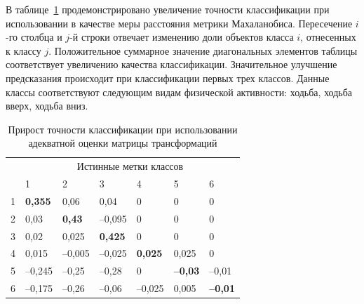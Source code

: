 	В таблице~\ref{ch5:tbl:improvement} продемонстрировано увеличение точности классификации при использовании в качестве меры расстояния метрики Махаланобиса.
	Пересечение $i$-го столбца и $j$-й строки отвечает изменению доли объектов класса $i$, отнесенных к классу $j$. Положительное суммарное значение диагональных элементов таблицы соответствует увеличению качества классификации. Значительное улучшение предсказания происходит при классификации первых трех классов.
	Данные классы соответствуют следующим видам физической активности: ходьба, ходьба вверх, ходьба вниз.
	
	\begin{table}
		\centering
		\caption{Прирост точности классификации при использовании адекватной оценки матрицы трансформаций}
		\label{ch5:tbl:improvement}
		\begin{tabular}{|l|l|l|l|l|l|l|}
			\hline
			\multirow{2}{*}{} & \multicolumn{6}{c|}{Истинные метки классов}       \\ \cline{2-7}
			& 1      & 2      & 3      & 4      & 5     & 6     \\ \hline
			1   & \textbf{0,355}  & 0,06   & 0,04   & 0      & 0     & 0     \\ \hline
			2   & 0,03   & \textbf{0,43}   & --0,095 & 0      & 0     & 0     \\ \hline
			3   & 0,02   & 0,025  & \textbf{0,425}  & 0      & 0     & 0     \\ \hline
			4   & 0,015  & --0,005 & --0,025 & \textbf{0,025}  & 0,025 & 0     \\ \hline
			5   & --0,245 & --0,25  & --0,28  & 0      & \textbf{--0,03} & --0,01 \\ \hline
			6   & --0,175 & --0,26  & --0,06  & --0,025 & 0,005 & \textbf{--0,01} \\ \hline
		\end{tabular}
	\end{table}
	